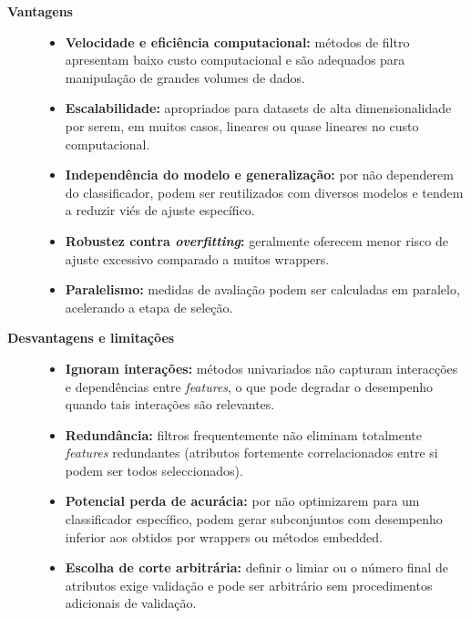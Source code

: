 \begin{description}
    \item[\textbf{Vantagens}] 
    \begin{itemize}
        \item \textbf{Velocidade e eficiência computacional:} métodos de filtro apresentam baixo custo computacional e são adequados para manipulação de grandes volumes de dados. \cite{Theng2024,Dhal2022}
        \item \textbf{Escalabilidade:} apropriados para datasets de alta dimensionalidade por serem, em muitos casos, lineares ou quase lineares no custo computacional. \cite{Dhal2022,bolon2018scalability}
        \item \textbf{Independência do modelo e generalização:} por não dependerem do classificador, podem ser reutilizados com diversos modelos e tendem a reduzir viés de ajuste específico. \cite{EBRAHIMIWARKIANI2025129372,BARBIERI2024123667}
        \item \textbf{Robustez contra \emph{overfitting}:} geralmente oferecem menor risco de ajuste excessivo comparado a muitos wrappers. \cite{reunanen2012overfitting}
        \item \textbf{Paralelismo:} medidas de avaliação podem ser calculadas em paralelo, acelerando a etapa de seleção. \cite{de2006parallelizing}
    \end{itemize}

    \item[\textbf{Desvantagens e limitações}]
    \begin{itemize}
        \item \textbf{Ignoram interações:} métodos univariados não capturam interacções e dependências entre \emph{features}, o que pode degradar o desempenho quando tais interações são relevantes. \cite{Dhal2022,Theng2024,EBRAHIMIWARKIANI2025129372}
        \item \textbf{Redundância:} filtros frequentemente não eliminam totalmente \emph{features} redundantes (atributos fortemente correlacionados entre si podem ser todos seleccionados). \cite{Theng2024,EBRAHIMIWARKIANI2025129372,KHAIRE20221060}
        \item \textbf{Potencial perda de acurácia:} por não optimizarem para um classificador específico, podem gerar subconjuntos com desempenho inferior aos obtidos por wrappers ou métodos embedded. \cite{Dhal2022,EBRAHIMIWARKIANI2025129372}
        \item \textbf{Escolha de corte arbitrária:} definir o limiar ou o número final de atributos exige validação e pode ser arbitrário sem procedimentos adicionais de validação. \cite{Theng2024}
    \end{itemize}
\end{description}

